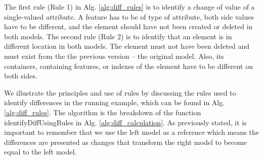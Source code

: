\documentclass{jot}
\begin{document}
The first rule (Rule 1) in Alg. \ref{alg:diff_rules} is to identify a change of value of a single-valued attribute. A feature has to be of type of \textsf{attribute}, both side values have to be different, and the element should have not been created or deleted in both models. The second rule (Rule 2) is to identify that an element is in different location in both models. The element must not have been deleted and must exist from the the previous version -- the original model. Also, its containers, containing features, or indexes of the element have to be different on both sides.

We illustrate the principles and use of rules by discussing the rules used to identify differences in the running example, which can be found in Alg. \ref{alg:diff_rules}. The algorithm is the breakdown of the function \textsf{identifyDiffUsingRules} in Alg. \ref{alg:diff_calculation}. As previously stated, it is important to remember that we use the left model as a reference which means the differences are presented as changes that transform the right model to become equal to the left model. 
\end{document}
